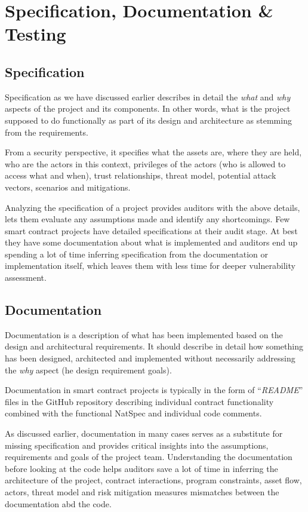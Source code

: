 \section{Specification, Documentation \&
Testing}\label{specification-documentation-testing}

\subsection{Specification}\label{specification}

Specification as we have discussed earlier describes in detail the
\emph{what} and \emph{why} aspects of the project and its components. In
other words, what is the project supposed to do functionally as part of
its design and architecture as stemming from the requirements.

From a security perspective, it specifies what the assets are, where
they are held, who are the actors in this context, privileges of the
actors (who is allowed to access what and when), trust relationships,
threat model, potential attack vectors, scenarios and mitigations.

Analyzing the specification of a project provides auditors with the
above details, lets them evaluate any assumptions made and identify any
shortcomings. Few smart contract projects have detailed specifications
at their audit stage. At best they have some documentation about what is
implemented and auditors end up spending a lot of time inferring
specification from the documentation or implementation itself, which
leaves them with less time for deeper vulnerability assessment.

\subsection{Documentation}\label{documentation}

Documentation is a description of what has been implemented based on the
design and architectural requirements. It should describe in detail how
something has been designed, architected and implemented without
necessarily addressing the \emph{why} aspect (he design requirement
goals).

Documentation in smart contract projects is typically in the form of
``\emph{README}'' files in the GitHub repository describing individual
contract functionality combined with the functional NatSpec and
individual code comments.

As discussed earlier, documentation in many cases serves as a substitute
for missing specification and provides critical insights into the
assumptions, requirements and goals of the project team. Understanding
the documentation before looking at the code helps auditors save a lot
of time in inferring the architecture of the project, contract
interactions, program constraints, asset flow, actors, threat model and
risk mitigation measures mismatches between the documentation abd the
code.

